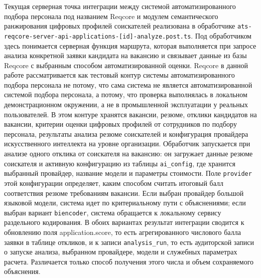 Текущая серверная точка интеграции между системой автоматизированного подбора персонала под названием Reqcore и модулем семантического ранжирования цифровых профилей соискателей реализована в обработчике \texttt{ats-reqcore-server-api-applications-{[}id{]}-analyze.post.ts}. Под обработчиком здесь понимается серверная функция маршрута, которая выполняется при запросе анализа конкретной заявки кандидата на вакансию и связывает данные из базы Reqcore с выбранным способом автоматизированной оценки. Reqcore в данной работе рассматривается как тестовый контур системы автоматизированного подбора персонала не потому, что сама система не является автоматизированной системой подбора персонала, а потому, что проверка выполнялась в локальном демонстрационном окружении, а не в промышленной эксплуатации у реальных пользователей. В этом контуре хранятся вакансии, резюме, отклики кандидатов на вакансии, критерии оценки цифровых профилей от сотрудников по подбору персонала, результаты анализа резюме соискателей и конфигурация провайдера искусственного интеллекта на уровне организации. Обработчик запускается при анализе одного отклика от соискателя на вакансию: он загружает данные резюме соискателя и активную конфигурацию из таблицы \texttt{ai\_config}, где хранится выбранный провайдер, название модели и параметры стоимости. Поле \texttt{provider} этой конфигурации определяет, каким способом считать итоговый балл соответствия резюме требованиям вакансии. Если выбран провайдер большой языковой модели, система идет по критериальному пути с объяснениями; если выбран вариант \texttt{biencoder}, система обращается к локальному сервису раздельного кодирования. В обоих вариантах результат интеграции сводится к обновлению поля application.score, то есть агрегированного числового балла заявки в таблице откликов, и к записи \texttt{analysis\_run}, то есть аудиторской записи о запуске анализа, выбранном провайдере, модели и служебных параметрах расчета. Различается только способ получения этого числа и объем сохраняемого объяснения.


